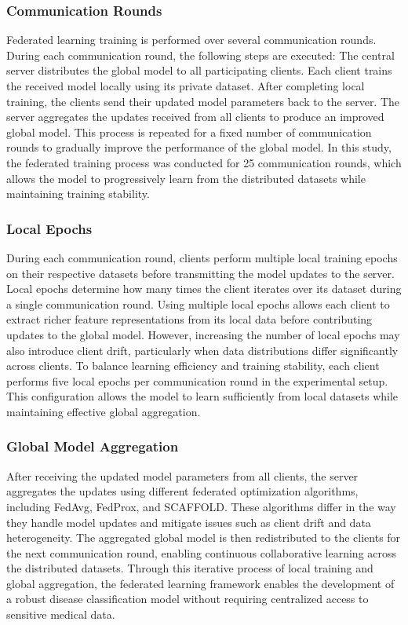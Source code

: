 \documentclass[12pt]{book}
\begin{document}
\subsubsection{Communication Rounds}
Federated learning training is performed over several communication rounds. During each communication round, the following steps are executed:
The central server distributes the global model to all participating clients.
Each client trains the received model locally using its private dataset.
After completing local training, the clients send their updated model parameters back to the server.
The server aggregates the updates received from all clients to produce an improved global model.
This process is repeated for a fixed number of communication rounds to gradually improve the performance of the global model. In this study, the federated training process was conducted for 25 communication rounds, which allows the model to progressively learn from the distributed datasets while maintaining training stability.
\subsubsection{Local Epochs}
During each communication round, clients perform multiple local training epochs on their respective datasets before transmitting the model updates to the server. Local epochs determine how many times the client iterates over its dataset during a single communication round.
Using multiple local epochs allows each client to extract richer feature representations from its local data before contributing updates to the global model. However, increasing the number of local epochs may also introduce client drift, particularly when data distributions differ significantly across clients.
To balance learning efficiency and training stability, each client performs five local epochs per communication round in the experimental setup. This configuration allows the model to learn sufficiently from local datasets while maintaining effective global aggregation.
\subsubsection{Global Model Aggregation}
After receiving the updated model parameters from all clients, the server aggregates the updates using different federated optimization algorithms, including FedAvg, FedProx, and SCAFFOLD. These algorithms differ in the way they handle model updates and mitigate issues such as client drift and data heterogeneity.
The aggregated global model is then redistributed to the clients for the next communication round, enabling continuous collaborative learning across the distributed datasets.
Through this iterative process of local training and global aggregation, the federated learning framework enables the development of a robust disease classification model without requiring centralized access to sensitive medical data.\\
\end{document}

